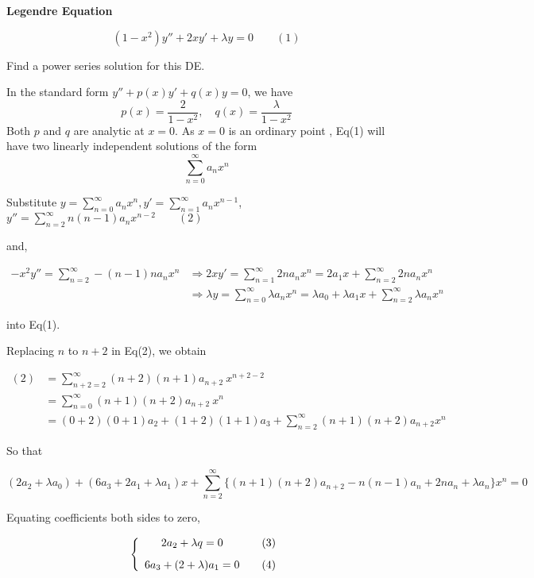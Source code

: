 \begin{example}
    \textbf{Legendre Equation}

    \[
        (1 - x^2)y'' + 2xy' + \lambda y = 0 \quad \quad (1)
    \]

    Find a power series solution for this DE.
\end{example}
\begin{solution}
    In the standard form $y'' + p(x)y' + q(x)y = 0$, we have 
    \[
        p(x) = \frac{2}{1 - x^2}, \quad q(x) = \frac{\lambda}{1 - x^2}
    \]
    Both $p$ and $q$ are analytic at $x=0$. As $x=0$ is an ordinary point
    , Eq(1) will have two linearly independent solutions of the form 
    \[
        \sum^\infty_{n=0}a_nx^n 
    \]

    Substitute $\displaystyle y = \sum^\infty_{n=0} a_nx^n, y' = \sum^\infty_{n=1}a_nx^{n-1}$,
    $\displaystyle y'' = \sum^\infty_{n=2} n (n-1)a_nx^{n-2} \quad \quad (2)$

    and,

    \begin{align*}
        -x^2y'' = \sum^\infty_{n=2} -(n-1)na_nx^{n} &\Rightarrow 2xy' = \sum^\infty_{n=1} 2na_nx^n = 2a_1x + \sum^\infty_{n=2} 2na_nx^n\\
        &\Rightarrow \lambda y = \sum^\infty_{n=0} \lambda a_n x^n = \lambda a_0 + \lambda a_1 x + \sum^\infty_{n=2} \lambda a_n x^n
    \end{align*}

    into Eq(1).

    Replacing $n$ to $n+2$ in Eq(2), we obtain

    \begin{align*}
        (2) &= \sum^\infty_{n+2=2} (n+2)(n+1) a_{n+2}\>  x^{n+2-2} \\ 
        &= \sum_{n=0}^{\infty} (n+1)(n+2)a_{n+2}\> x^n \\
        &= (0+2)(0+1)a_2 + (1+2)(1+1)a_3 + \sum^\infty_{n=2}(n+1)(n+2)a_{n+2}x^n
    \end{align*}

    So that 

    \[
        (2a_2 + \lambda a_0) + (6a_3 + 2a_1 + \lambda a_1) x + \sum_{n=2}^{\infty} \biggl\{(n+1)(n+2)a_{n+2}
        - n(n-1)a_n + 2na_n + \lambda a_n \biggr\} x^n = 0    
    \]

    Equating coefficients both sides to zero,

    \[
        \left\{
        \begin{array}{cc}
         2a_2 + \lambda q = 0 & \quad \refstepcounter{equation}(3)\\[0.8em]
         6a_3 + (2 + \lambda) a_1 = 0 & \quad \refstepcounter{equation}(4)
        \end{array}
        \right.
    \]


\end{solution}
